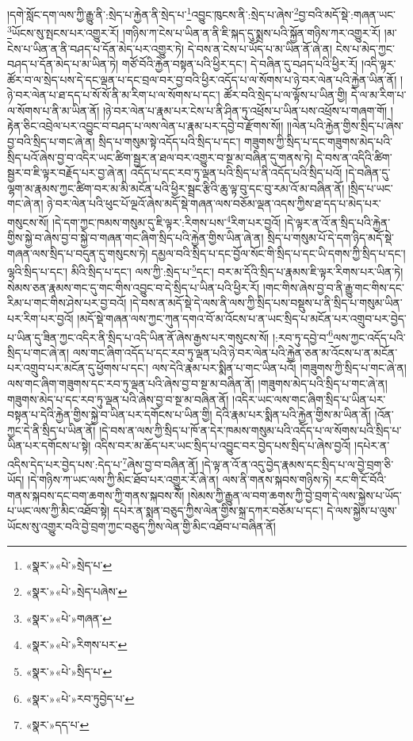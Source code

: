 །དགེ་སློང་དག་ལས་ཀྱི་རྒྱུ་ནི་:སྲེད་པ་རྐྱེན་ནི་སྲེད་པ་\footnote{«སྣར་»«པེ་»སྲེད་པ་}འབྱུང་ཁུངས་ནི་:སྲེད་པ་ཞེས་\footnote{«སྣར་»«པེ་»སྲེད་པཞེས་}བྱ་བའི་མདོ་སྡེ་:གཞན་ཡང་\footnote{«སྣར་»«པེ་»གཞན་}ཡོངས་སུ་སྤངས་པར་འགྱུར་རོ། །གཉིས་ཀ་ངེས་པ་ཡིན་ན་ནི་ཇི་སྐད་དུ་སྨྲས་པའི་སྐྱོན་གཉིས་ཀར་འགྱུར་རོ། །མ་ངེས་པ་ཡིན་ན་ནི་བཤད་པ་དོན་མེད་པར་འགྱུར་ཏེ། དེ་བས་ན་ངེས་པ་ཡོད་པ་མ་ཡིན་ནོ་ཞེ་ན། ངེས་པ་མེད་ཀྱང་བཤད་པ་དོན་མེད་པ་མ་ཡིན་ཏེ། གཙོ་བོའི་རྐྱེན་བསྟན་པའི་ཕྱིར་དང་། དེ་བཞིན་དུ་བཤད་པའི་ཕྱིར་རོ། །འདི་ལྟར་ཚོར་བ་ལ་སྲེད་པས་དེ་དང་ལྡན་པ་དང་བྲལ་བར་བྱ་བའི་ཕྱིར་འདོད་པ་ལ་སོགས་པ་ཉེ་བར་ལེན་པའི་རྐྱེན་ཡིན་ནོ། །ཉེ་བར་ལེན་པ་ཐ་དད་པ་སོ་སོ་ནི་མ་རིག་པ་ལ་སོགས་པ་དང་། ཚོར་བའི་སྲེད་པ་ལ་ལྟོས་པ་ཡིན་གྱི། དེ་ལ་མ་རིག་པ་ལ་སོགས་པ་ནི་མ་ཡིན་ནོ། །ཉེ་བར་ལེན་པ་རྣམ་པར་ངེས་པ་ནི་ཤིན་ཏུ་འཕྲོས་པ་ཡིན་པས་འཕྲོས་པ་གཞག་གོ། །རྟེན་ཅིང་འབྲེལ་པར་འབྱུང་བ་བཤད་པ་ལས་ལེན་པ་རྣམ་པར་དབྱེ་བ་རྫོགས་སོ།། །།ལེན་པའི་རྐྱེན་གྱིས་སྲིད་པ་ཞེས་བྱ་བའི་སྲིད་པ་གང་ཞེ་ན། སྲིད་པ་གསུམ་སྟེ་འདོད་པའི་སྲིད་པ་དང་། གཟུགས་ཀྱི་སྲིད་པ་དང་གཟུགས་མེད་པའི་སྲིད་པའོ་ཞེས་བྱ་བ་འདིར་ཡང་ཚིག་སྦྱར་ན་ཐལ་བར་འགྱུར་བ་སྔ་མ་བཞིན་དུ་གནས་ཏེ། དེ་བས་ན་འདིའི་ཚིག་སྦྱར་བ་ཇི་ལྟར་བརྗོད་པར་བྱ་ཞེ་ན། འདོད་པ་དང་རབ་ཏུ་ལྡན་པའི་སྲིད་པ་ནི་འདོད་པའི་སྲིད་པའོ། །དེ་བཞིན་དུ་ལྷག་མ་རྣམས་ཀྱང་ཚིག་བར་མ་མི་མངོན་པའི་ཕྱིར་སྦྲང་རྩིའི་ཆུ་ལྟ་བུ་དང་བུ་རམ་འོ་མ་བཞིན་ནོ། །སྲིད་པ་ཡང་གང་ཞེ་ན། ཉེ་བར་ལེན་པའི་ཕུང་པོ་ལྔའོ་ཞེས་མདོ་སྡེ་གཞན་ལས་བཅོམ་ལྡན་འདས་ཀྱིས་ཐ་དད་པ་མེད་པར་གསུངས་སོ། །དེ་དག་ཀྱང་ཁམས་གསུམ་དུ་ཇི་ལྟར་:རིགས་པས་\footnote{«སྣར་»«པེ་»རིགས་པར་}རིག་པར་བྱའོ། །དེ་ལྟར་ན་འོ་ན་སྲིད་པའི་རྐྱེན་གྱིས་སྐྱེ་བ་ཞེས་བྱ་བ་སྐྱེ་བ་གཞན་གང་ཞིག་སྲིད་པའི་རྐྱེན་གྱིས་ཡིན་ཞེ་ན། སྲིད་པ་གསུམ་པོ་དེ་དག་ཉིད་མདོ་སྡེ་གཞན་ལས་སྲིད་པ་བདུན་དུ་གསུངས་ཏེ། དམྱལ་བའི་སྲིད་པ་དང་བྱོལ་སོང་གི་སྲིད་པ་དང་ཡི་དགས་ཀྱི་སྲིད་པ་དང་། ལྷའི་སྲིད་པ་དང་། མིའི་སྲིད་པ་དང་། ལས་ཀྱི་:སྲེད་པ་\footnote{«སྣར་»«པེ་»སྲིད་པ་}དང་། བར་མ་དོའི་སྲིད་པ་རྣམས་ཇི་ལྟར་རིགས་པར་ཡིན་ཏེ། སེམས་ཅན་རྣམས་གང་དུ་གང་གིས་འབྱུང་བ་དེ་སྲིད་པ་ཡིན་པའི་ཕྱིར་རོ། །གང་གིས་ཞེས་བྱ་བ་ནི་རྒྱུ་གང་གིས་དང་རིམ་པ་གང་གིས་ཤེས་པར་བྱ་བའོ། །དེ་བས་ན་མདོ་སྡེ་དེ་ལས་ནི་ལས་ཀྱི་སྲིད་པས་བསྡུས་པ་ནི་སྲིད་པ་གསུམ་ཡིན་པར་རིག་པར་བྱའོ། །མདོ་སྡེ་གཞན་ལས་ཀྱང་ཀུན་དགའ་བོ་མ་འོངས་པ་ན་ཡང་སྲིད་པ་མངོན་པར་འགྲུབ་པར་བྱེད་པ་ཡིན་དུ་ཟིན་ཀྱང་འདིར་ནི་སྲིད་པ་འདི་ཡིན་ནོ་ཞེས་རྒྱས་པར་གསུངས་སོ། །:རབ་ཏུ་དབྱེ་བ་\footnote{«སྣར་»«པེ་»རབ་ཏུབྱེད་པ་}ལས་ཀྱང་འདོད་པའི་སྲིད་པ་གང་ཞེ་ན། ལས་གང་ཞིག་འདོད་པ་དང་རབ་ཏུ་ལྡན་པའི་ཉེ་བར་ལེན་པའི་རྐྱེན་ཅན་མ་འོངས་པ་ན་མངོན་པར་འགྲུབ་པར་མངོན་དུ་ཕྱོགས་པ་དང་། ལས་དེའི་རྣམ་པར་སྨིན་པ་གང་ཡིན་པའོ། །གཟུགས་ཀྱི་སྲིད་པ་གང་ཞེ་ན། ལས་གང་ཞིག་གཟུགས་དང་རབ་ཏུ་ལྡན་པའི་ཞེས་བྱ་བ་སྔ་མ་བཞིན་ནོ། །གཟུགས་མེད་པའི་སྲིད་པ་གང་ཞེ་ན། གཟུགས་མེད་པ་དང་རབ་ཏུ་ལྡན་པའི་ཞེས་བྱ་བ་སྔ་མ་བཞིན་ནོ། །འདིར་ཡང་ལས་གང་ཞིག་སྲིད་པ་ཡིན་པར་བསྟན་པ་དེའི་རྐྱེན་གྱིས་སྐྱེ་བ་ཡིན་པར་དགོངས་པ་ཡིན་གྱི། དེའི་རྣམ་པར་སྨིན་པའི་རྐྱེན་གྱིས་མ་ཡིན་ནོ། །འོན་ཀྱང་དེ་ནི་སྲིད་པ་ཡིན་ནོ། །དེ་བས་ན་ལས་ཀྱི་སྲིད་པ་ཁོ་ན་དེར་ཁམས་གསུམ་པའི་འདོད་པ་ལ་སོགས་པའི་སྲིད་པ་ཡིན་པར་དགོངས་པ་སྟེ། འདིས་བར་མ་ཆོད་པར་ཡང་སྲིད་པ་འབྱུང་བར་བྱེད་པས་སྲིད་པ་ཞེས་བྱའོ། །དཔེར་ན་འདིས་དེད་པར་བྱེད་པས་:དེད་པ་\footnote{«སྣར་»དད་པ་}ཞེས་བྱ་བ་བཞིན་ནོ། །དེ་ལྟ་ན་འོ་ན་འདུ་བྱེད་རྣམས་དང་སྲིད་པ་ལ་བྱེ་བྲག་ཅི་ཡོད། །དེ་གཉིས་ཀ་ཡང་ལས་ཀྱི་མིང་ཐོབ་པར་འགྱུར་རོ་ཞེ་ན། ལས་ནི་གནས་སྐབས་གཉིས་ཏེ། རང་གི་ངོ་བོའི་གནས་སྐབས་དང་བག་ཆགས་ཀྱི་གནས་སྐབས་སོ། །སེམས་ཀྱི་རྒྱུན་ལ་བག་ཆགས་ཀྱི་བྱེ་བྲག་དེ་ལས་སྐྱེས་པ་ཡོད་པ་ཡང་ལས་ཀྱི་མིང་འཐོབ་སྟེ། དཔེར་ན་སྨན་བཅུད་ཀྱིས་ལེན་གྱིས་སྐྲ་དཀར་བཅོམ་པ་དང་། དེ་ལས་སྐྱེས་པ་ལུས་ཡོངས་སུ་འགྱུར་བའི་བྱེ་བྲག་ཀྱང་བཅུད་ཀྱིས་ལེན་གྱི་མིང་འཐོབ་པ་བཞིན་ནོ། 